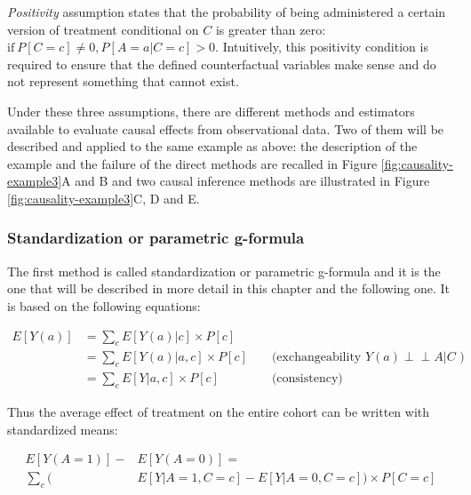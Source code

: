 \documentclass[a4paper,12pt,twoside,onecolumn,openright,final,oldfontcommands]{memoir}
\begin{document}
\emph{Positivity} assumption states that the probability of being
administered a certain version of treatment conditional on \(C\) is
greater than zero: \(\textrm{if} \: P[C=c] \neq 0, P[A=a | C=c] >0.\)
Intuitively, this positivity condition is required to ensure that the
defined counterfactual variables make sense and do not represent
something that cannot exist.

Under these three assumptions, there are different methods and
estimators available to evaluate causal effects from observational data.
Two of them will be described and applied to the same example as above:
the description of the example and the failure of the direct methods are
recalled in Figure \ref{fig:causality-example3}A and B and two causal
inference methods are illustrated in Figure
\ref{fig:causality-example3}C, D and E.

\subsubsection{Standardization or parametric
g-formula}\label{std-classic}

The first method is called standardization or parametric g-formula and
it is the one that will be described in more detail in this chapter and
the following one. It is based on the following equations:

\begin{equation*}
\begin{aligned}
  E[Y(a)] & = \sum_{c} E[Y(a)|c] \times P[c] \\
          & = \sum_{c} E[Y(a)|a,c] \times P[c]
          &&\text{ (exchangeability } Y(a) \perp \!\!\! \perp A | C \text{ )} \\
          & = \sum_{c} E[Y|a,c] \times P[c]
          &&\text{ (consistency)}
\end{aligned}
\end{equation*}

Thus the average effect of treatment on the entire cohort can be written
with standardized means:

\begin{equation}
\begin{aligned}
  E[Y(A=1)] - & E[Y(A=0)] = \\ 
   \sum_{c} \Big( & E[Y | A=1, C=c]-E[Y | A=0, C=c]\Big) \times P[C=c]
\end{aligned}
\end{equation}
\end{document}

